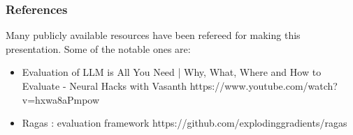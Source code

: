 \begin{frame}\frametitle{References}
Many publicly available resources have been refereed for making this presentation. Some of the notable ones are:
\footnotesize
\begin{itemize}
\item Evaluation of LLM is All You Need | Why, What, Where and How to Evaluate - Neural Hacks with Vasanth https://www.youtube.com/watch?v=hxwa8aPmpow
\item Ragas : evaluation framework 	 https://github.com/explodinggradients/ragas
\end{itemize}

\end{frame}